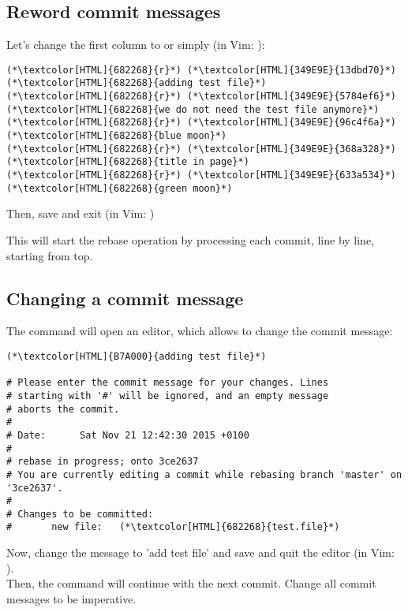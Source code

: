 \subsection{Reword commit messages}
\begin{frame}[fragile]
  \subslidetitle

  Let's change the first column to  or simply  (in Vim: ):
  \begin{lstlisting}
(*\textcolor[HTML]{682268}{r}*) (*\textcolor[HTML]{349E9E}{13dbd70}*) (*\textcolor[HTML]{682268}{adding test file}*)
(*\textcolor[HTML]{682268}{r}*) (*\textcolor[HTML]{349E9E}{5784ef6}*) (*\textcolor[HTML]{682268}{we do not need the test file anymore}*)
(*\textcolor[HTML]{682268}{r}*) (*\textcolor[HTML]{349E9E}{96c4f6a}*) (*\textcolor[HTML]{682268}{blue moon}*)
(*\textcolor[HTML]{682268}{r}*) (*\textcolor[HTML]{349E9E}{368a328}*) (*\textcolor[HTML]{682268}{title in page}*)
(*\textcolor[HTML]{682268}{r}*) (*\textcolor[HTML]{349E9E}{633a534}*) (*\textcolor[HTML]{682268}{green moon}*)
\end{lstlisting}
  Then, save and exit (in Vim: )

  \vspace{1em}
  This will start the rebase operation by processing each commit, line by line, starting from top.

\end{frame}

\subsection{Changing a commit message}
\begin{frame}[fragile]
  \subslidetitle

  The  command will open an editor, which allows to change the commit message:
  \begin{lstlisting}
(*\textcolor[HTML]{B7A000}{adding test file}*)

# Please enter the commit message for your changes. Lines
# starting with '#' will be ignored, and an empty message
# aborts the commit.
#
# Date:      Sat Nov 21 12:42:30 2015 +0100
#
# rebase in progress; onto 3ce2637
# You are currently editing a commit while rebasing branch 'master' on '3ce2637'.
#
# Changes to be committed:
#       new file:   (*\textcolor[HTML]{682268}{test.file}*)
\end{lstlisting}

  Now, change the message to 'add test file' and save and quit the editor (in Vim: ).
  \\
  \vspace{1em}
  Then, the  command will continue with the next commit. Change all commit
  messages to be imperative.
\end{frame}

